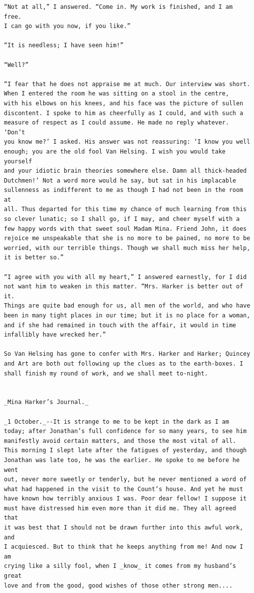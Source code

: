 \documentclass{article}
\begin{document}
\begin{verbatim}
“Not at all,” I answered. “Come in. My work is finished, and I am free.
I can go with you now, if you like.”

“It is needless; I have seen him!”

“Well?”

“I fear that he does not appraise me at much. Our interview was short.
When I entered the room he was sitting on a stool in the centre,
with his elbows on his knees, and his face was the picture of sullen
discontent. I spoke to him as cheerfully as I could, and with such a
measure of respect as I could assume. He made no reply whatever. ‘Don’t
you know me?’ I asked. His answer was not reassuring: ‘I know you well
enough; you are the old fool Van Helsing. I wish you would take yourself
and your idiotic brain theories somewhere else. Damn all thick-headed
Dutchmen!’ Not a word more would he say, but sat in his implacable
sullenness as indifferent to me as though I had not been in the room at
all. Thus departed for this time my chance of much learning from this
so clever lunatic; so I shall go, if I may, and cheer myself with a
few happy words with that sweet soul Madam Mina. Friend John, it does
rejoice me unspeakable that she is no more to be pained, no more to be
worried, with our terrible things. Though we shall much miss her help,
it is better so.”

“I agree with you with all my heart,” I answered earnestly, for I did
not want him to weaken in this matter. “Mrs. Harker is better out of it.
Things are quite bad enough for us, all men of the world, and who have
been in many tight places in our time; but it is no place for a woman,
and if she had remained in touch with the affair, it would in time
infallibly have wrecked her.”

So Van Helsing has gone to confer with Mrs. Harker and Harker; Quincey
and Art are both out following up the clues as to the earth-boxes. I
shall finish my round of work, and we shall meet to-night.


_Mina Harker’s Journal._

_1 October._--It is strange to me to be kept in the dark as I am
today; after Jonathan’s full confidence for so many years, to see him
manifestly avoid certain matters, and those the most vital of all.
This morning I slept late after the fatigues of yesterday, and though
Jonathan was late too, he was the earlier. He spoke to me before he went
out, never more sweetly or tenderly, but he never mentioned a word of
what had happened in the visit to the Count’s house. And yet he must
have known how terribly anxious I was. Poor dear fellow! I suppose it
must have distressed him even more than it did me. They all agreed that
it was best that I should not be drawn further into this awful work, and
I acquiesced. But to think that he keeps anything from me! And now I am
crying like a silly fool, when I _know_ it comes from my husband’s great
love and from the good, good wishes of those other strong men....


\end{verbatim}
\end{document}
